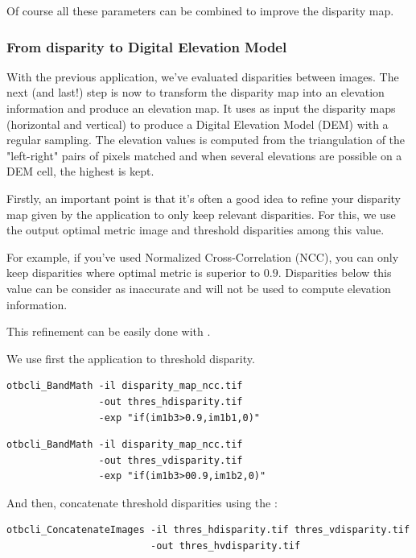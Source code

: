 Of course all these parameters can be combined to improve the disparity map.

\subsubsection{From disparity to Digital Elevation Model}

With the previous application, we've evaluated disparities between images. The
next (and last!) step is now to transform the disparity map into an elevation
information and produce an elevation map. It uses as input the disparity maps
(horizontal and vertical) to produce a Digital Elevation Model (DEM) with a
regular sampling. The elevation values is computed from the triangulation of the
"left-right" pairs of pixels matched and when several elevations are possible on
a DEM cell, the highest is kept.

Firstly, an important point is that it's often a good idea to refine your disparity
map given by the  application to only keep relevant
disparities. For this, we use the output optimal metric image and threshold
disparities among this value.

For example, if you've used Normalized Cross-Correlation (NCC), you can only
keep disparities where optimal metric is superior to $0.9$. Disparities below
this value can be consider as inaccurate and will not be used to compute
elevation information.

This refinement can be easily done with \app.

We use first the  application to threshold disparity.

\begin{verbatim}
otbcli_BandMath -il disparity_map_ncc.tif
                -out thres_hdisparity.tif
                -exp "if(im1b3>0.9,im1b1,0)"
\end{verbatim}

\begin{verbatim}
otbcli_BandMath -il disparity_map_ncc.tif
                -out thres_vdisparity.tif
                -exp "if(im1b3>00.9,im1b2,0)"
\end{verbatim}

And then, concatenate threshold disparities using the :

\begin{verbatim}
otbcli_ConcatenateImages -il thres_hdisparity.tif thres_vdisparity.tif
                         -out thres_hvdisparity.tif
\end{verbatim}

